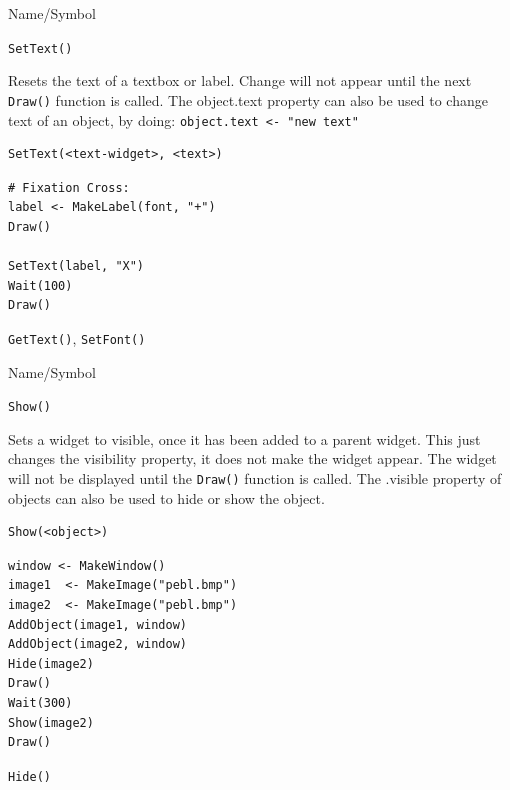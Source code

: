 \begin{desc}{Name/Symbol}

\item[Name/Symbol] 	\verb+SetText()+

\item[Description] 	Resets the text of a textbox or label.  Change will not
		appear until the next \verb+Draw()+ function is called.  The
object.text property can also be used to change text of an object, by
doing: \verb+object.text <- "new text"+

\item[Usage]
\begin{verbatim}
SetText(<text-widget>, <text>)
\end{verbatim}

\item[Example]
\begin{verbatim}
# Fixation Cross:
label <- MakeLabel(font, "+")
Draw()

SetText(label, "X")
Wait(100)
Draw()
\end{verbatim}

\item[See Also]    	\verb+GetText()+, \verb+SetFont()+
\end{desc}

\begin{desc}{Name/Symbol}
\item[Name/Symbol]  	\verb+Show()+

\item[Description] Sets a widget to visible, once it has been added to
  a parent widget.  This just changes the visibility property, it does
  not make the widget appear.  The widget will not be displayed until
  the \verb+Draw()+ function is called.  The .visible property of
objects can also be used to hide or show the object.

\item[Usage]
\begin{verbatim}
Show(<object>)
\end{verbatim}

\item[Example]
\begin{verbatim}
window <- MakeWindow()
image1  <- MakeImage("pebl.bmp")
image2  <- MakeImage("pebl.bmp")
AddObject(image1, window)
AddObject(image2, window)
Hide(image2)
Draw()
Wait(300)
Show(image2)
Draw()
\end{verbatim}

\item[See Also]     	\verb+Hide()+
\end{desc}



